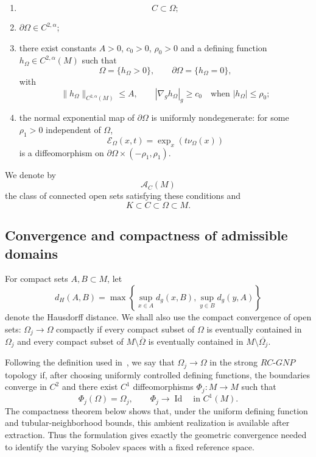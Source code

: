\documentclass{article}
\begin{document}
\begin{enumerate}
\item
\[
C\subset\Omega;
\]

\item $\partial\Omega\in C^{2,\alpha}$;

\item there exist constants $A>0$, $c_0>0$, $\rho_0>0$ and a defining
function $h_\Omega\in C^{2,\alpha}(M)$ such that
\[
\Omega=\{h_\Omega>0\},
\qquad
\partial\Omega=\{h_\Omega=0\},
\]
with
\[
\|h_\Omega\|_{C^{2,\alpha}(M)}\leq A,
\qquad
|\nabla_g h_\Omega|_g\geq c_0
\quad\text{when }|h_\Omega|\leq\rho_0;
\]

\item the normal exponential map of $\partial\Omega$ is uniformly
nondegenerate: for some $\rho_1>0$ independent of $\Omega$,
\[
\mathcal E_\Omega(x,t)=\exp_x(t\nu_\Omega(x))
\]
is a diffeomorphism on
$\partial\Omega\times(-\rho_1,\rho_1)$.
\end{enumerate}

We denote by
\[
\mathcal A_C(M)
\]
the class of connected open sets satisfying these conditions and
\[
K\subset C\subset\Omega\subset M.
\]

\subsection{Convergence and compactness of admissible domains}
For compact sets $A,B\subset M$, let
\[
d_H(A,B)=\max\left\{\sup_{x\in A}d_g(x,B),
\sup_{y\in B}d_g(y,A)\right\}
\]
denote the Hausdorff distance. We shall also use the compact convergence
of open sets: $\Omega_j\to\Omega$ compactly if every compact subset of
$\Omega$ is eventually contained in $\Omega_j$ and every compact subset
of $M\setminus\overline\Omega$ is eventually contained in
$M\setminus\overline{\Omega_j}$.

Following the definition used in~\cite{DS3}, we say that $\Omega_j\to\Omega$ in the strong $RC$-$GNP$ topology if,
after choosing uniformly controlled defining functions, the boundaries
converge in $C^2$ and there exist $C^1$ diffeomorphisms $\Phi_j:M\to M$
such that
\[
\Phi_j(\Omega)=\Omega_j,
\qquad
\Phi_j\longrightarrow\operatorname{Id}
\quad\text{in }C^1(M).
\]
The compactness theorem below shows that, under the uniform defining
function and tubular-neighborhood bounds, this ambient realization is
available after extraction. Thus the formulation gives exactly the
geometric convergence needed to identify the varying Sobolev spaces with
a fixed reference space.
\end{document}
